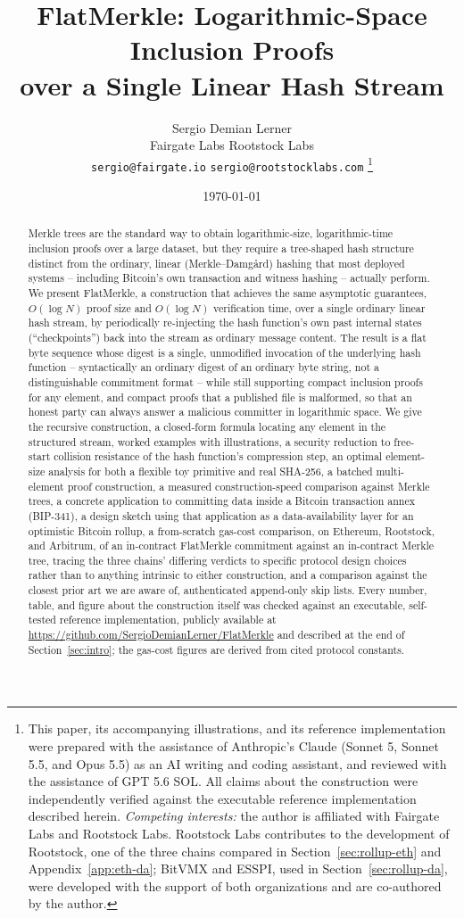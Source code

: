 \documentclass[11pt]{article}
\title{\textbf{FlatMerkle: Logarithmic-Space Inclusion Proofs\\ over a Single Linear Hash Stream}}
\author{Sergio Demian Lerner \\[2pt]
  Fairgate Labs \quad Rootstock Labs \\
  \texttt{sergio@fairgate.io} \quad \texttt{sergio@rootstocklabs.com}%
  \thanks{This paper, its accompanying illustrations, and its reference
  implementation were prepared with the assistance of Anthropic's Claude
  (Sonnet 5, Sonnet 5.5, and Opus 5.5) as an AI writing and coding
  assistant, and reviewed with the assistance of GPT 5.6 SOL. All claims
  about the construction were independently verified against the
  executable reference implementation described herein.
  \textit{Competing interests:} the author is affiliated with Fairgate Labs
  and Rootstock Labs. Rootstock Labs contributes to the development of
  Rootstock, one of the three chains compared in Section~\ref{sec:rollup-eth}
  and Appendix~\ref{app:eth-da}; BitVMX and ESSPI, used in
  Section~\ref{sec:rollup-da}, were developed with the support of both
  organizations and are co-authored by the author.}}
\date{\today}
\begin{document}
\maketitle

\begin{abstract}
Merkle trees are the standard way to obtain logarithmic-size, logarithmic-time
inclusion proofs over a large dataset, but they require a tree-shaped hash
structure distinct from the ordinary, linear (Merkle--Damg\aa rd) hashing that
most deployed systems -- including Bitcoin's own transaction and witness
hashing -- actually perform. We present FlatMerkle, a construction that
achieves the same asymptotic guarantees, $O(\log N)$ proof size and
$O(\log N)$ verification time, over a single ordinary linear hash stream, by
periodically re-injecting the hash function's own past internal states
(``checkpoints'') back into the stream as ordinary message content. The
result is a flat byte sequence whose digest is a single, unmodified
invocation of the underlying hash function -- syntactically an ordinary
digest of an ordinary byte string, not a distinguishable commitment format
-- while still supporting compact inclusion proofs for any element, and
compact proofs that a published file is malformed, so that an honest party
can always answer a malicious committer in logarithmic space. We give the recursive
construction, a closed-form formula locating any element in the structured
stream, worked examples with illustrations, a security reduction to free-start
collision resistance of the hash function's compression step, an optimal
element-size analysis for both a flexible toy primitive and real SHA-256,
a batched multi-element proof construction, a measured construction-speed
comparison against Merkle trees, a concrete application to committing data
inside a Bitcoin transaction annex (BIP-341), a design sketch using that
application as a data-availability layer for an optimistic Bitcoin rollup,
a from-scratch gas-cost comparison, on Ethereum, Rootstock, and Arbitrum,
of an in-contract FlatMerkle commitment against an in-contract Merkle
tree, tracing the three chains' differing verdicts to specific protocol
design choices rather than to anything intrinsic to either construction,
and a comparison against the closest prior art we are aware of,
authenticated append-only skip lists.
Every number, table, and figure about the construction itself was checked
against an executable, self-tested reference implementation, publicly
available at \url{https://github.com/SergioDemianLerner/FlatMerkle} and
described at the end of Section~\ref{sec:intro}; the gas-cost figures are
derived from
cited protocol constants.
\end{abstract}
\end{document}
